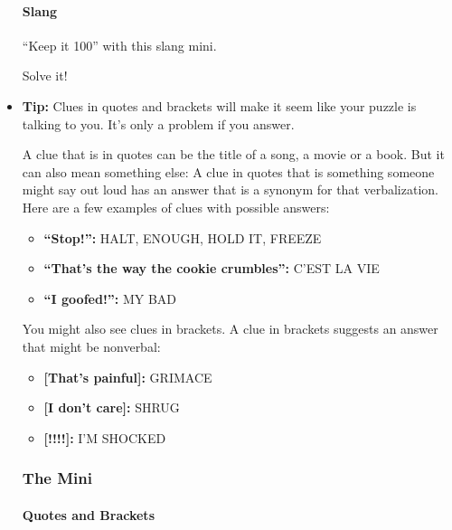 \begin{itemize}
  \hypertarget{slang}{%
  \paragraph{Slang}\label{slang}}

  ``Keep it 100'' with this slang mini.

  Solve it!
\item
  \textbf{Tip:} Clues in quotes and brackets will make it seem like your
  puzzle is talking to you. It's only a problem if you answer.

  A clue that is in quotes can be the title of a song, a movie or a
  book. But it can also mean something else: A clue in quotes that is
  something someone might say out loud has an answer that is a synonym
  for that verbalization. Here are a few examples of clues with possible
  answers:

  \begin{itemize}
  \tightlist
  \item
    \textbf{``Stop!'':} HALT, ENOUGH, HOLD IT, FREEZE
  \item
    \textbf{``That's the way the cookie crumbles'':} C'EST LA VIE
  \item
    \textbf{``I goofed!'':} MY BAD
  \end{itemize}

  You might also see clues in brackets. A clue in brackets suggests an
  answer that might be nonverbal:~

  \begin{itemize}
  \tightlist
  \item
    \textbf{{[}That's painful{]}:} GRIMACE
  \item
    \textbf{{[}I don't care{]}:} SHRUG
  \item
    \textbf{{[}!!!!{]}:} I'M SHOCKED
  \end{itemize}

  \hypertarget{the-mini-11}{%
  \subsubsection{The Mini}\label{the-mini-11}}

  \href{https://www.nytimes.com/crosswords/game/special/quotes-and-brackets}{}

  \hypertarget{quotes-and-brackets}{%
  \paragraph{Quotes and Brackets}\label{quotes-and-brackets}}


\end{itemize}
